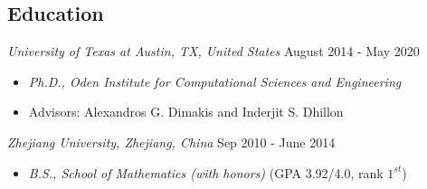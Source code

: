 \documentclass[margin, 10pt]{res} %
\begin{document}
\begin{resume}

 









\section{Education}
{\sl University of Texas at Austin, TX, United States} \hfill August 2014 - May 2020
\begin{itemize}
\item {\sl Ph.D., Oden Institute for Computational Sciences and Engineering} 
\item Advisors: Alexandros 
  G. Dimakis  and Inderjit S. Dhillon
\end{itemize} 



{\sl Zhejiang University, Zhejiang, China} \hfill Sep 2010 - June 2014 \begin{itemize}
  \item {\sl B.S., School of Mathematics (with honors)} (GPA 3.92/4.0, rank $1^{st}$)
\end{itemize}


\end{resume}
\end{document}
